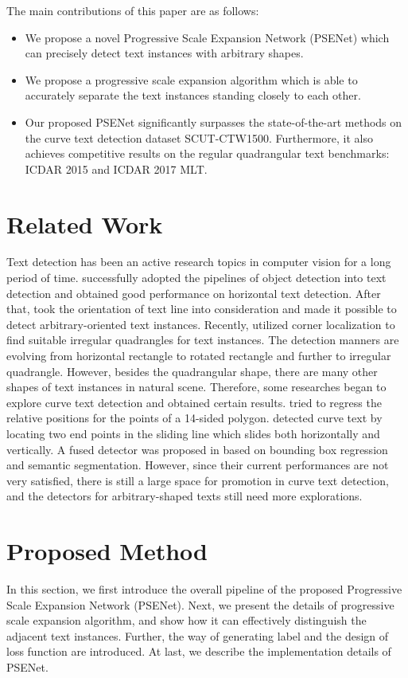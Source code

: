 \documentclass{article}
\begin{document}
The main contributions of this paper are as follows:
\begin{itemize}[leftmargin=*]
\item We propose a novel Progressive Scale Expansion Network (PSENet) which can precisely detect text instances with arbitrary shapes.
\item We propose a progressive scale expansion algorithm which is able to accurately separate the text instances standing closely to each other.
\item Our proposed PSENet significantly surpasses the state-of-the-art methods on the curve text detection dataset SCUT-CTW1500. Furthermore, it also achieves competitive results on the regular quadrangular text benchmarks: ICDAR 2015 and ICDAR 2017 MLT. 
\end{itemize}

\section{Related Work}
Text detection has been an active research topics in computer vision for a long period of time. \cite{zhong2016deeptext, liao2017textboxes} successfully adopted the pipelines of object detection into text detection and obtained good performance on horizontal text detection.
After that, \cite{shi2017detecting, zhou2017east, liu2018fots, jiang2017r2cnn, he2017single, hu2017wordsup} took the orientation of text line into consideration and made it possible to detect arbitrary-oriented text instances. Recently, \cite{lyu2018multi} utilized corner localization to find suitable irregular quadrangles for text instances. The detection manners are evolving from horizontal rectangle to rotated rectangle and further to irregular quadrangle. However, besides the quadrangular shape, there are many other shapes of text instances in natural scene. Therefore, some researches began to explore curve text detection and obtained certain results. \cite{Liu2017Detecting} tried to regress the relative positions for the points of a 14-sided polygon. \cite{zhu2018sliding} detected curve text by locating two end points in the sliding line which slides both horizontally and vertically. A fused detector was proposed in \cite{dai2017fused} based on bounding box regression and semantic segmentation. However, since their current performances are not very satisfied, there is still a large space for promotion in curve text detection, and the detectors for arbitrary-shaped texts still need more explorations.

\section{Proposed Method}
In this section, we first introduce the overall pipeline of the proposed Progressive Scale Expansion Network (PSENet). Next, we present the details of progressive scale expansion algorithm, and show how it can effectively distinguish the adjacent text instances. Further, the way of generating label and the design of loss function are introduced. At last, we describe the implementation details of PSENet.
\end{document}
